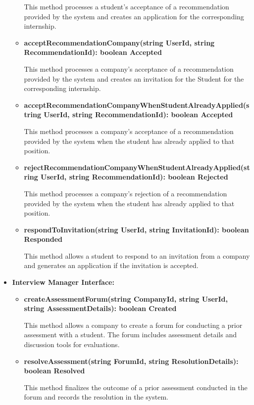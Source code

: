 \begin{itemize}
\begin{itemize}
    This method processes a student's acceptance of a recommendation provided by the system and creates an application for the corresponding internship.

    \item \textbf{acceptRecommendationCompany(string UserId, string RecommendationId): boolean Accepted}

    This method processes a company's acceptance of a recommendation provided by the system and creates an invitation for the Student for the corresponding internship.

    \item \textbf{acceptRecommendationCompanyWhenStudentAlreadyApplied(string UserId, string RecommendationId): boolean Accepted}

    This method processes a company's acceptance of a recommendation provided by the system when the student has already applied to that position.
    
    \item \textbf{rejectRecommendationCompanyWhenStudentAlreadyApplied(string UserId, string RecommendationId): boolean Rejected}

    This method processes a company's rejection of a recommendation provided by the system when the student has already applied to that position.
    
    \item \textbf{respondToInvitation(string UserId, string InvitationId): boolean Responded}

    This method allows a student to respond to an invitation from a company and generates an application if the invitation is accepted.
\end{itemize}

\item \textbf{Interview Manager Interface:}
\begin{itemize}
    \item \textbf{createAssessmentForum(string CompanyId, string UserId, string AssessmentDetails): boolean Created}

    This method allows a company to create a forum for conducting a prior assessment with a student. The forum includes assessment details and discussion tools for evaluations.

    \item \textbf{resolveAssessment(string ForumId, string ResolutionDetails): boolean Resolved}

    This method finalizes the outcome of a prior assessment conducted in the forum and records the resolution in the system.


\end{itemize}
\end{itemize}
